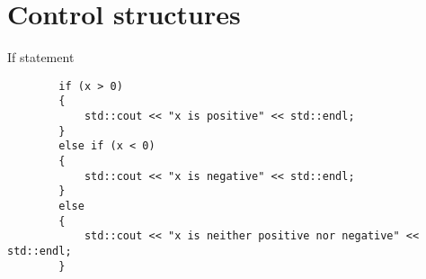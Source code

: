 \part{Control structures}
\frame{\partpage}

\begin{frame}[fragile]{If statement}
	\begin{lstlisting}
		if (x > 0)
		{
		    std::cout << "x is positive" << std::endl;
		}
		else if (x < 0)
		{
		    std::cout << "x is negative" << std::endl;
		}
		else
		{
		    std::cout << "x is neither positive nor negative" << std::endl;
		}
	\end{lstlisting}
\end{frame}

